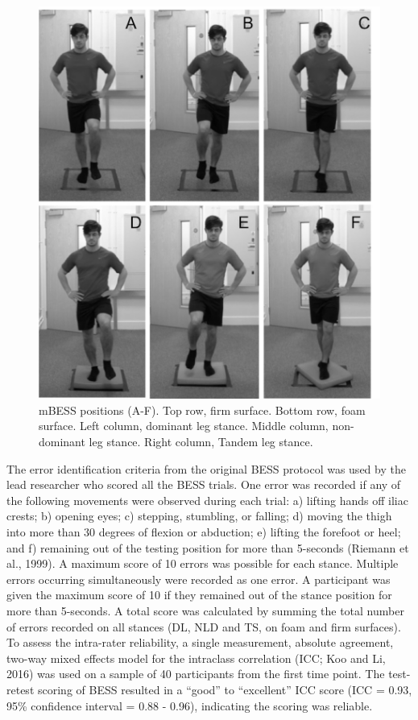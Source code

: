 \documentclass[
  english,
  man,floatsintext]{apa6}
\begin{document}
\begin{figure}[!h]

{\centering \includegraphics[width=1\linewidth]{figures_doc/Fig2} 

}

\caption{mBESS positions (A-F). Top row, firm surface. Bottom row, foam surface. Left column, dominant leg stance. Middle column, non-dominant leg stance. Right column, Tandem leg stance.}\label{fig:fig2}
\end{figure}

The error identification criteria from the original BESS protocol was used by the lead researcher who scored all the BESS trials.
One error was recorded if any of the following movements were observed during each trial: a) lifting hands off iliac crests;
b) opening eyes;
c) stepping, stumbling, or falling;
d) moving the thigh into more than 30 degrees of flexion or abduction;
e) lifting the forefoot or heel; and
f) remaining out of the testing position for more than 5-seconds (Riemann et al., 1999).
A maximum score of 10 errors was possible for each stance. Multiple errors occurring simultaneously were recorded as one error.
A participant was given the maximum score of 10 if they remained out of the stance position for more than 5-seconds.
A total score was calculated by summing the total number of errors recorded on all stances (DL, NLD and TS, on foam and firm surfaces).
To assess the intra-rater reliability, a single measurement, absolute agreement, two-way mixed effects model for the intraclass correlation (ICC; Koo and Li, 2016) was used on a sample of 40 participants from the first time point.
The test-retest scoring of BESS resulted in a ``good'' to ``excellent'' ICC score (ICC = 0.93, 95\% confidence interval = 0.88 - 0.96), indicating the scoring was reliable.
\end{document}
